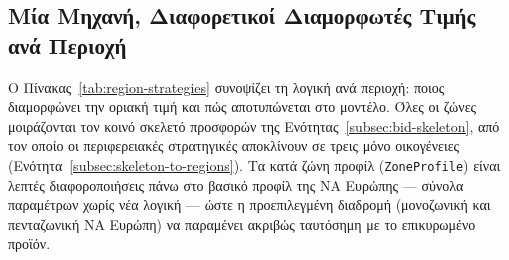 \subsection{Μία Μηχανή, Διαφορετικοί Διαμορφωτές Τιμής ανά Περιοχή}
\label{subsec:region-strategies}

Ο Πίνακας~\ref{tab:region-strategies} συνοψίζει τη λογική ανά περιοχή: ποιος διαμορφώνει την οριακή τιμή και πώς αποτυπώνεται στο μοντέλο. Όλες οι ζώνες μοιράζονται τον κοινό σκελετό προσφορών της Ενότητας~\ref{subsec:bid-skeleton}, από τον οποίο οι περιφερειακές στρατηγικές αποκλίνουν σε τρεις μόνο οικογένειες (Ενότητα~\ref{subsec:skeleton-to-regions}). Τα κατά ζώνη προφίλ (\texttt{ZoneProfile}) είναι λεπτές διαφοροποιήσεις πάνω στο βασικό προφίλ της ΝΑ Ευρώπης --- σύνολα παραμέτρων χωρίς νέα λογική --- ώστε η προεπιλεγμένη διαδρομή (μονοζωνική και πενταζωνική ΝΑ Ευρώπη) να παραμένει ακριβώς ταυτόσημη με το επικυρωμένο προϊόν.

